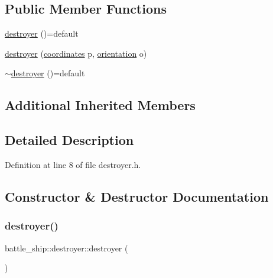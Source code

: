 \subsection*{Public Member Functions}
\begin{DoxyCompactItemize}
\item 
\hyperlink{classbattle__ship_1_1destroyer_ae26647f7b12b2dc4cc1ef6951734a08b}{destroyer} ()=default
\item 
\hyperlink{classbattle__ship_1_1destroyer_af0f630a4ecc4d6667b6adf021633da83}{destroyer} (\hyperlink{structbattle__ship_1_1coordinates}{coordinates} p, \hyperlink{namespacebattle__ship_aed87488f0a73f0d0679fe343fb61c784}{orientation} o)
\item 
\hyperlink{classbattle__ship_1_1destroyer_a6abbf5c8970c69703ae57786e2247f9a}{$\sim$destroyer} ()=default
\end{DoxyCompactItemize}
\subsection*{Additional Inherited Members}


\subsection{Detailed Description}


Definition at line 8 of file destroyer.\+h.



\subsection{Constructor \& Destructor Documentation}
\mbox{\label{classbattle__ship_1_1destroyer_ae26647f7b12b2dc4cc1ef6951734a08b}} 
\subsubsection{\texorpdfstring{destroyer()}{destroyer()}\hspace{0.1cm}{\footnotesize\ttfamily [1/2]}}
{\footnotesize\ttfamily battle\+\_\+ship\+::destroyer\+::destroyer (\begin{DoxyParamCaption}{ }\end{DoxyParamCaption})\hspace{0.3cm}{\ttfamily [default]}}

